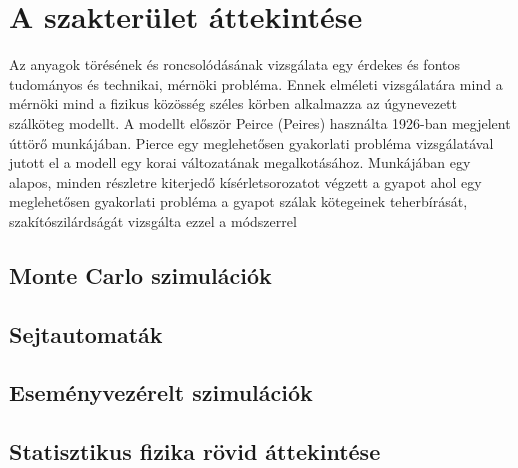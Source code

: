 \chapter{A szakterület áttekintése}

Az anyagok törésének és roncsolódásának vizsgálata egy érdekes és fontos tudományos és technikai, mérnöki probléma. Ennek elméleti vizsgálatára mind a mérnöki mind a fizikus közösség széles körben alkalmazza az úgynevezett szálköteg modellt.
A modellt először Peirce (Peires) használta 1926-ban megjelent úttörő munkájában. Pierce egy meglehetősen gyakorlati probléma vizsgálatával jutott el a modell egy korai változatának megalkotásához. Munkájában egy alapos, minden részletre kiterjedő kísérletsorozatot végzett a gyapot ahol egy meglehetősen gyakorlati probléma a gyapot szálak kötegeinek teherbírását, szakítószilárdságát vizsgálta ezzel a módszerrel




\section{Monte Carlo szimulációk}

\section{Sejtautomaták}

\section{Eseményvezérelt szimulációk}

\section{Statisztikus fizika rövid áttekintése}


